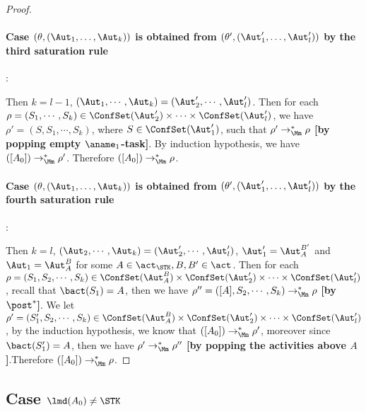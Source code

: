 \begin{proof}
\paragraph{Case $(\theta,(\Aut_1,\dots,\Aut_k))$ is obtained from $(\theta',(\Aut_1',\dots,\Aut_l'))$ by the third saturation rule} :

Then $k = l - 1$, $(\Aut_1,\cdots,\Aut_k) = (\Aut_2',\cdots,\Aut_l')$.
Then for each $\rho=(S_1,\cdots,S_k)\in\ConfSet(\Aut_2')\times\cdots\times\ConfSet(\Aut_l')$, we have $\rho'=(S,S_1,\cdots,S_k)$, where $S\in\ConfSet(\Aut_1')$, such that $\rho'\rightarrow_{\Mm}^*\rho$ \textbf{[by popping empty $\aname_1$-task]}. By induction hypothesis, we have $([A_0])\rightarrow_{\Mm}^* \rho'$. Therefore $([A_0])\rightarrow_{\Mm}^*\rho$.
\paragraph{Case $(\theta,(\Aut_1,\dots,\Aut_k))$ is obtained from $(\theta',(\Aut_1',\dots,\Aut_l'))$ by the fourth saturation rule} :

Then $k=l$, $(\Aut_2,\cdots,\Aut_k) = (\Aut_2',\cdots,\Aut_l')$, $\Aut_1' = \Aut_A^{B'}$ and $\Aut_1 = \Aut_A^{B}$ for some $A\in\act_{\STK},B,B'\in\act$.
Then for each $\rho=(S_1,S_2,\cdots,S_k)\in\ConfSet(\Aut_A^B)\times\ConfSet(\Aut_2')\times\cdots\times\ConfSet(\Aut_l')$, recall that $\bact(S_1) = A$, then we have $\rho'' = ([A],S_2,\cdots,S_k)\rightarrow_{\Mm}^*\rho$ \textbf{[by $\post^*$]}.
We let $\rho'=(S_1',S_2,\cdots,S_k)\in\ConfSet(\Aut_A^B)\times\ConfSet(\Aut_2')\times\cdots\times\ConfSet(\Aut_l')$, by the induction hypothesis, we know that $([A_0])\rightarrow_{\Mm}^*\rho'$, moreover since $\bact(S_1') = A$, then we have $\rho'\rightarrow_{\Mm}^*\rho''$ \textbf{[by popping the activities above $A$]}.Therefore $([A_0])\rightarrow_{\Mm}^*\rho$.
\end{proof}


\subsection{Case $\lmd(A_0)\neq\STK$}\label{sec:a0nostk}


